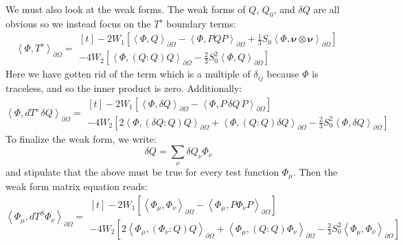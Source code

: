 \documentclass[reqno]{article}
\begin{document}
We must also look at the weak forms. 
The weak forms of $Q$, $Q_0$, and $\delta Q$ are all obvious so we instead focus on the $T^s$ boundary terms:
\begin{equation}
    \left<\Phi, T^s \right>_{\partial \Omega}
    =
    \begin{multlined}[t]
        -2 W_1 \left[
            \left<\Phi, Q\right>_{\partial \Omega}
            - \left<\Phi, PQP \right>_{\partial \Omega}
            + \tfrac13 S_0 \left<\Phi, \boldsymbol\nu \otimes \boldsymbol\nu\right>_{\partial \Omega}
        \right] \\
        - 4 W_2 \left[ 
            \left< \Phi, \left(Q : Q\right) Q \right>_{\partial \Omega}
            - \tfrac23 S_0^2 \left< \Phi, Q \right>_{\partial \Omega}
        \right]
    \end{multlined}
\end{equation}
Here we have gotten rid of the term which is a multiple of $\delta_{ij}$ because $\Phi$ is traceless, and so the inner product is zero.
Additionally:
\begin{equation}
    \left<\Phi, dT^s \, \delta Q\right>_{\partial \Omega}
    =
    \begin{multlined}[t]
        -2 W_1 \left[
            \left< \Phi, \delta Q \right>_{\partial \Omega}
            - \left< \Phi, P \, \delta Q \, P \right>_{\partial \Omega}
        \right] \\
        - 4 W_2 \left[ 
            2\left<\Phi, \left( \delta Q : Q \right) Q \right>_{\partial \Omega}
            + \left<\Phi, \left( Q : Q \right) \delta Q \right>_{\partial \Omega}
            - \frac23 S_0^2 \left<\Phi, \delta Q \right>_{\partial \Omega}
        \right] 
    \end{multlined}
\end{equation}
To finalize the weak form, we write:
\begin{equation}
    \delta Q
    =
    \sum_\nu \delta Q_\nu \Phi_\nu
\end{equation}
and stipulate that the above must be true for every test function $\Phi_\mu$.
Then the weak form matrix equation reads:
\begin{equation}
    \left< \Phi_\mu, dT^S \Phi_\nu \right>_{\partial \Omega}
    =
    \begin{multlined}[t]
        -2 W_1 \left[ 
            \left< \Phi_\mu, \Phi_\nu \right>_{\partial \Omega}
            - \left< \Phi_\mu, P \Phi_\nu P \right>_{\partial \Omega}
        \right] \\
        - 4 W_2 \left[
            2 \left< \Phi_\mu, \left( \Phi_\nu : Q \right) Q \right>_{\partial \Omega}
            + \left< \Phi_\mu, \left( Q : Q \right) \Phi_\nu \right>_{\partial \Omega}
            - \tfrac23 S_0^2 \left< \Phi_\mu, \Phi_\nu \right>_{\partial \Omega}
        \right]
    \end{multlined}
\end{equation}
\end{document}

